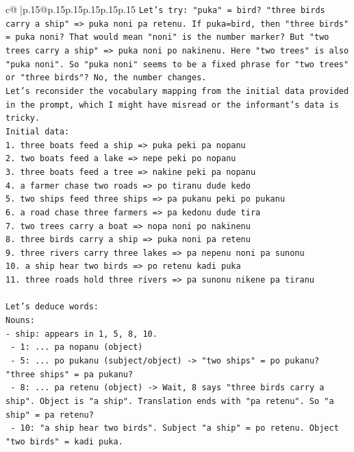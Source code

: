 \documentclass{article}
\begin{document}
{\begin{supertabular}{c@{$\;$}|p{.15\linewidth}@{}p{.15\linewidth}p{.15\linewidth}p{.15\linewidth}p{.15\linewidth}p{.15\linewidth}}
{{{\texttt{Let's try: "puka" = bird? "three birds carry a ship" => puka noni pa retenu. If puka=bird, then "three birds" = puka noni? That would mean "noni" is the number marker? But "two trees carry a ship" => puka noni po nakinenu. Here "two trees" is also "puka noni". So "puka noni" seems to be a fixed phrase for "two trees" or "three birds"? No, the number changes.} \\
\texttt{Let's reconsider the vocabulary mapping from the initial data provided in the prompt, which I might have misread or the informant's data is tricky.} \\
\texttt{Initial data:} \\
\texttt{1. three boats feed a ship => puka peki pa nopanu} \\
\texttt{2. two boats feed a lake => nepe peki po nopanu} \\
\texttt{3. three boats feed a tree => nakine peki pa nopanu} \\
\texttt{4. a farmer chase two roads => po tiranu dude kedo} \\
\texttt{5. two ships feed three ships => pa pukanu peki po pukanu} \\
\texttt{6. a road chase three farmers => pa kedonu dude tira} \\
\texttt{7. two trees carry a boat => nopa noni po nakinenu} \\
\texttt{8. three birds carry a ship => puka noni pa retenu} \\
\texttt{9. three rivers carry three lakes => pa nepenu noni pa sunonu} \\
\texttt{10. a ship hear two birds => po retenu kadi puka} \\
\texttt{11. three roads hold three rivers => pa sunonu nikene pa tiranu} \\
\\ 
\texttt{Let's deduce words:} \\
\texttt{Nouns:} \\
\texttt{{-} ship: appears in 1, 5, 8, 10.} \\
\texttt{  {-} 1: ... pa nopanu (object)} \\
\texttt{  {-} 5: ... po pukanu (subject/object) {-}> "two ships" = po pukanu? "three ships" = pa pukanu?} \\
\texttt{  {-} 8: ... pa retenu (object) {-}> Wait, 8 says "three birds carry a ship". Object is "a ship". Translation ends with "pa retenu". So "a ship" = pa retenu?} \\
\texttt{  {-} 10: "a ship hear two birds". Subject "a ship" = po retenu. Object "two birds" = kadi puka.} \\
}}}
\end{supertabular}}
\end{document}
